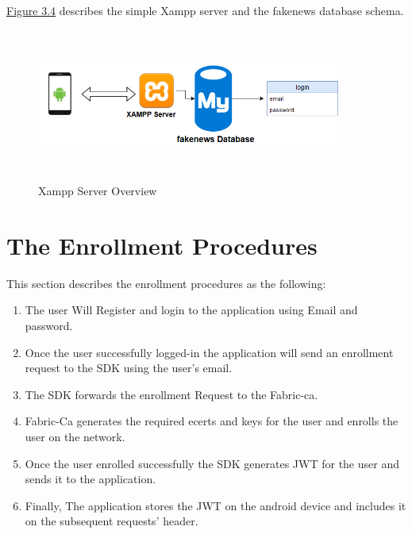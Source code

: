\hyperref[fig:xampp]{Figure 3.4} describes the simple Xampp server and the fakenews database schema.     
 \begin{figure}[H]
\centering
\includegraphics[width=10cm,height=5cm]{images/xampp.jpg}
\caption{Xampp Server Overview}
\label{fig:xampp}
\end{figure}

\cleardoublepage

\section{The Enrollment Procedures} 
This section describes the enrollment procedures as the following: 


\begin{enumerate}
  \item The user Will Register and login to the application using Email and password.
  \item Once the user successfully logged-in the application will send an enrollment request to the SDK using the user's email.
  \item The SDK forwards the enrollment Request to the Fabric-ca.
  \item Fabric-Ca generates the required ecerts and keys for the user and enrolls the user on the network.
   \item Once the user enrolled successfully the SDK generates JWT for the user and sends it to the application. 
    \item Finally, The application stores the JWT on the android device and includes it on the subsequent requests' header.
 
\end{enumerate}

